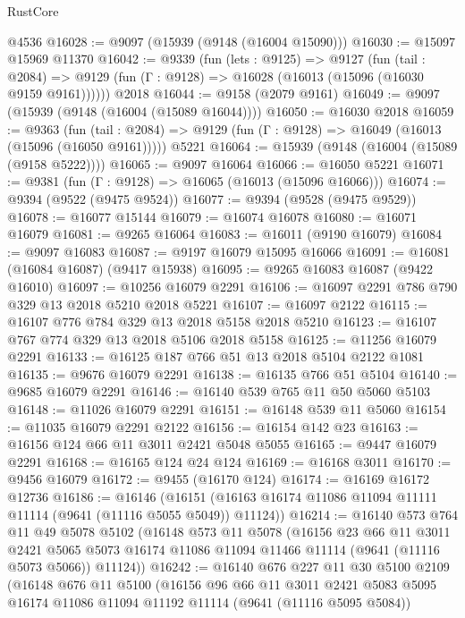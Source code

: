 \begin{lexlean}{RustCore}
\begin{coremodule}
    @4536
@16028 := @9097 (@15939 (@9148 (@16004 @15090)))
@16030 := @15097 @15969 @11370
@16042 := @9339
    (fun (lets : @9125) =>
    @9127
      (fun (tail : @2084) =>
      @9129 (fun (Γ : @9128) => @16028 (@16013 (@15096 (@16030 @9159 @9161))))))
    @2018
@16044 := @9158 (@2079 @9161)
@16049 := @9097 (@15939 (@9148 (@16004 (@15089 @16044))))
@16050 := @16030 @2018
@16059 := @9363
    (fun (tail : @2084) => @9129 (fun (Γ : @9128) => @16049 (@16013 (@15096 (@16050 @9161)))))
    @5221
@16064 := @15939 (@9148 (@16004 (@15089 (@9158 @5222))))
@16065 := @9097 @16064
@16066 := @16050 @5221
@16071 := @9381 (fun (Γ : @9128) => @16065 (@16013 (@15096 @16066)))
@16074 := @9394 (@9522 (@9475 @9524))
@16077 := @9394 (@9528 (@9475 @9529))
@16078 := @16077 @15144
@16079 := @16074 @16078
@16080 := @16071 @16079
@16081 := @9265 @16064
@16083 := @16011 (@9190 @16079)
@16084 := @9097 @16083
@16087 := @9197 @16079 @15095 @16066
@16091 := @16081 (@16084 @16087) (@9417 @15938)
@16095 := @9265 @16083 @16087 (@9422 @16010)
@16097 := @10256 @16079 @2291
@16106 := @16097 @2291 @786 @790 @329 @13 @2018 @5210 @2018 @5221
@16107 := @16097 @2122
@16115 := @16107 @776 @784 @329 @13 @2018 @5158 @2018 @5210
@16123 := @16107 @767 @774 @329 @13 @2018 @5106 @2018 @5158
@16125 := @11256 @16079 @2291
@16133 := @16125 @187 @766 @51 @13 @2018 @5104 @2122 @1081
@16135 := @9676 @16079 @2291
@16138 := @16135 @766 @51 @5104
@16140 := @9685 @16079 @2291
@16146 := @16140 @539 @765 @11 @50 @5060 @5103
@16148 := @11026 @16079 @2291
@16151 := @16148 @539 @11 @5060
@16154 := @11035 @16079 @2291 @2122
@16156 := @16154 @142 @23
@16163 := @16156 @124 @66 @11 @3011 @2421 @5048 @5055
@16165 := @9447 @16079 @2291
@16168 := @16165 @124 @24 @124
@16169 := @16168 @3011
@16170 := @9456 @16079
@16172 := @9455 (@16170 @124)
@16174 := @16169 @16172 @12736
@16186 := @16146
    (@16151 (@16163 @16174 @11086 @11094 @11111 @11114 (@9641 (@11116 @5055 @5049)) @11124))
@16214 := @16140
    @573
    @764
    @11
    @49
    @5078
    @5102
    (@16148
      @573
      @11
      @5078
      (@16156
        @23
        @66
        @11
        @3011
        @2421
        @5065
        @5073
        @16174
        @11086
        @11094
        @11466
        @11114
        (@9641 (@11116 @5073 @5066))
        @11124))
@16242 := @16140
    @676
    @227
    @11
    @30
    @5100
    @2109
    (@16148
      @676
      @11
      @5100
      (@16156
        @96
        @66
        @11
        @3011
        @2421
        @5083
        @5095
        @16174
        @11086
        @11094
        @11192
        @11114
        (@9641 (@11116 @5095 @5084))

\end{coremodule}
\end{lexlean}
